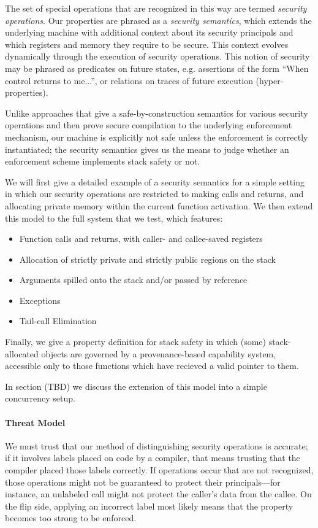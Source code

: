 \documentclass[10pt,conference]{ieeetran}%
\theoremstyle{definition}
\begin{document}
The set of special operations that are recognized in this way are termed
{\it security operations}. Our properties are phrased as a {\it security semantics},
which extends the underlying machine with additional context about its
security principals and which registers and memory they require to be secure.
This context evolves dynamically through the execution of security operations.
This notion of security may be phrased as
predicates on future states, e.g. assertions of the form
``When control returns to me...'', or relations on traces of future execution
(hyper-properties).

Unlike approaches that give a safe-by-construction semantics
for various security operations and then prove secure compilation to the underlying
enforcement mechanism, our machine is explicitly not safe unless the enforcement
is correctly instantiated; the security semantics gives us the means to judge whether
an enforcement scheme implements stack safety or not. 

We will first give a detailed example of a security semantics for a simple setting
in which our security operations are restricted to making calls and returns, and allocating
private memory within the current function activation. We then extend this model
to the full system that we test, which features:
\begin{itemize}
\item Function calls and returns, with caller- and callee-saved registers
\item Allocation of strictly private and strictly public regions on the stack
\item Arguments spilled onto the stack and/or passed by reference
\item Exceptions
\item Tail-call Elimination
\end{itemize}

Finally, we give a property definition for stack safety in which (some) stack-allocated
objects are governed by a provenance-based capability system, accessible only to those
functions which have recieved a valid pointer to them.

In section (TBD) we discuss the extension of this model into a simple concurrency setup.

\paragraph*{Threat Model}

We must trust that our method of distinguishing security operations is accurate; if it
involves labels placed on code by a compiler, that means trusting that the compiler placed
those labels correctly. If operations occur that are not recognized, those operations
might not be guaranteed to protect their principals---for instance, an unlabeled call
might not protect the caller's data from the callee. On the flip side, applying an incorrect
label most likely means that the property becomes too strong to be enforced.
\end{document}
